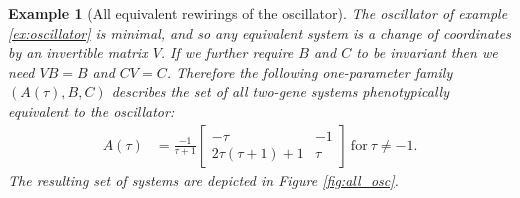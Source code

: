 \documentclass{article}
\newcommand{\1}{\mathbbm{1}}
\newtheorem{example}{Example}
\begin{document}
\begin{example}[All equivalent rewirings of the oscillator] \label{ex:all_osc}
The oscillator of example \ref{ex:oscillator} is minimal, and so any equivalent system is a change of coordinates
by an invertible matrix $V$.
If we further require $B$ and $C$ to be invariant then we need $VB=B$ and $CV=C$.
Therefore
the following one-parameter family $(A(\tau), B, C)$ describes the set of all two-gene systems
phenotypically equivalent to the oscillator:
    \begin{align*}
      A(\tau) &= \frac{-1}{\tau+1} \begin{bmatrix} -\tau & -1 \\ 2 \tau(\tau + 1) + 1 &  \tau \end{bmatrix} \ \text{for} \ \tau \neq -1 .
    \end{align*}
  The resulting set of systems are depicted in Figure \ref{fig:all_osc}. 
\end{example}
\end{document}
